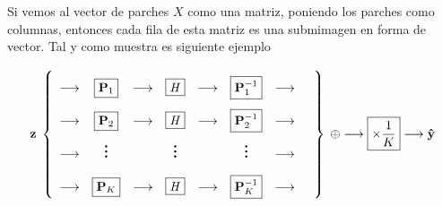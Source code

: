 Si vemos al vector de parches $X$ como una matriz, poniendo los parches como columnas, entonces cada fila de esta matriz es una submimagen en forma de vector. Tal y como muestra es siguiente ejemplo

\begin{equation}
	\z\;\left\{
	\def\arraystretch{2.2}
	\begin{array}{ccccccccc}
		\longrightarrow & \boxed{\P_1} & \longrightarrow & \boxed{\H} & \longrightarrow & \boxed{\P_1^{-1}} & \longrightarrow \\
		\longrightarrow & \boxed{\P_2} & \longrightarrow & \boxed{\H} & \longrightarrow & \boxed{\P_2^{-1}} & \longrightarrow \\
		\longrightarrow & \huge\vdots &  & \huge\vdots &  & \huge\vdots & \longrightarrow & \\
		\longrightarrow & \boxed{\P_K} & \longrightarrow & \boxed{\H} & \longrightarrow & \boxed{\P_K^{-1}} & \longrightarrow
	\end{array}
	\right\}\;\oplus\longrightarrow\boxed{\times\frac{1}{K}}\longrightarrow\yhat
\end{equation}

%	


